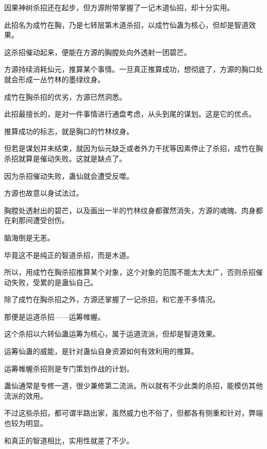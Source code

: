 \begin{this_body}
因果神树杀招还在起步，但方源附带掌握了一记木道仙招，却十分实用。

此招名为成竹在胸，乃是七转层第木道杀招，以成竹仙蛊为核心，但却是智道效果。

这杀招催动起来，便能在方源的胸膛处向外透射一团碧芒。

方源持续消耗仙元，推算某个事情。一旦真正推算成功，想彻底了，方源的胸口处就会形成一丛竹林的墨绿纹身。

成竹在胸杀招的优劣，方源已然洞悉。

此招最擅长的，是对一件事情进行通盘考虑，从头到尾的谋划。这是它的优点。

推算成功的标志，就是胸口的竹林纹身。

但若是谋划并未结束，就因为仙元缺乏或者外力干扰等因素停止了杀招，成竹在胸杀招就算是催动失败。这就是缺点了。

因为杀招催动失败，蛊仙就会遭受反噬。

方源也故意以身试法过。

胸膛处透射出的碧芒，以及画出一半的竹林纹身都骤然消失，方源的魂魄、肉身都在刹那间遭受创伤。

脑海倒是无恙。

毕竟这不是纯正的智道杀招，而是木道。

所以，用成竹在胸杀招推算某个对象，这个对象的范围不能太大太广，否则杀招催动失败，受累的是蛊仙自己。

除了成竹在胸杀招之外，方源还掌握了一记杀招，和它差不多情况。

那便是运道杀招——运筹帷幄。

这个杀招以六转仙蛊运筹为核心，属于运道流派，但却是智道效果。

运筹仙蛊的威能，是针对蛊仙自身资源如何有效利用的推算。

运筹帷幄杀招则是专门策划作战的计划。

蛊仙通常是专修一道，很少兼修第二流派。所以就有不少此类的杀招，能模仿其他流派的效用。

不过这些杀招，都可谓半路出家，虽然威力也不俗了，但都各有侧重和针对，弊端也较为明显。

和真正的智道相比，实用性就差了不少。

\end{this_body}

